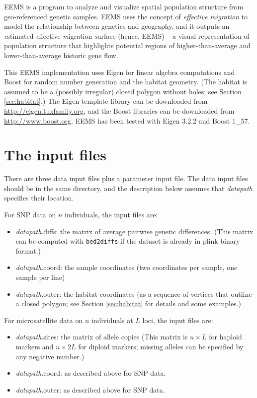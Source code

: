 \documentclass[a4paper,10pt,DIV=15,mpinclude=true]{scrartcl}
\begin{document}
EEMS is a program to analyze and visualize spatial population structure from geo-referenced genetic samples. EEMS uses the concept of \textit{effective migration} to model the relationship between genetics and geography, and it outputs an \textit{e}stimated \textit{e}ffective \textit{m}igration \textit{s}urface (hence, EEMS) -- a visual representation of population structure that highlights potential regions of higher-than-average and lower-than-average historic gene flow.

This EEMS implementation uses Eigen for linear algebra computations and Boost for random number generation and the habitat geometry. (The habitat is assumed to be a (possibly irregular) closed polygon without holes; see Section \ref{sec:habitat}.) The Eigen template library can be downloaded from \url{http://eigen.tuxfamily.org}, and the Boost libraries can be downloaded from \url{http://www.boost.org}. EEMS has been tested with Eigen 3.2.2 and Boost 1\_57.

\section{The input files}

There are three data input files plus a parameter input file. The data input files should be in the same directory, and the description below assumes that \textit{datapath} specifies their location.

For SNP data on $n$ individuals, the input files are:
\begin{itemize}
  \item \textit{datapath}.diffs: the matrix of average pairwise genetic differences. (This matrix can be computed with {\tt bed2diffs} if the dataset is already in plink binary format.)
  \item \textit{datapath}.coord: the sample coordinates (two coordinates per sample, one sample per line)
  \item \textit{datapath}.outer: the habitat coordinates (as a sequence of vertices that outline a closed polygon; see Section \ref{sec:habitat} for details and some examples.)
\end{itemize}

For microsatellite data on $n$ individuals at $L$ loci, the input files are:
\begin{itemize}
  \item \textit{datapath}.sites: the matrix of allele copies (This matrix is $n\times L $ for haploid markers and $n\times2L$ for diploid markers; missing alleles can be specified by any negative number.)
  \item \textit{datapath}.coord: as described above for SNP data.
  \item \textit{datapath}.outer: as described above for SNP data.
\end{itemize}
\end{document}
